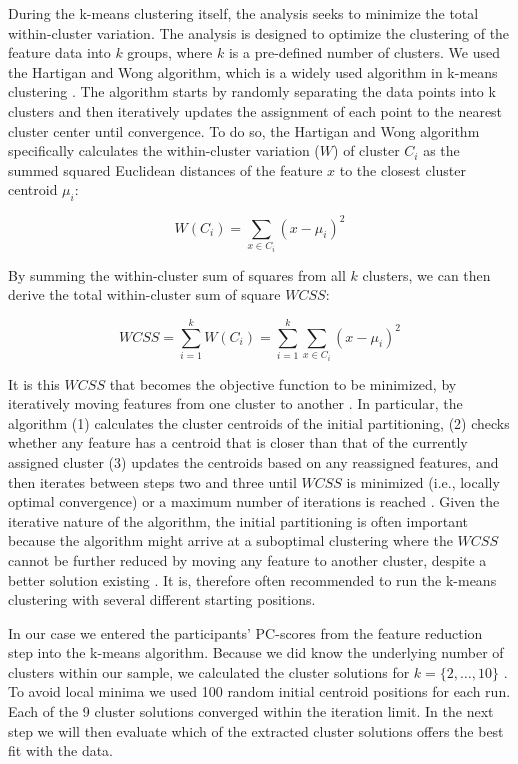 During the k-means clustering itself, the analysis seeks to minimize the
total within-cluster variation. The analysis is designed to optimize the
clustering of the feature data into \(k\) groups, where \(k\) is a
pre-defined number of clusters. We used the Hartigan and Wong algorithm,
which is a widely used algorithm in k-means clustering
\citep{hartigan1979}. The algorithm starts by randomly separating the
data points into k clusters and then iteratively updates the assignment
of each point to the nearest cluster center until convergence. To do so,
the Hartigan and Wong algorithm specifically calculates the
within-cluster variation (\(W\)) of cluster \(C_i\) as the summed
squared Euclidean distances of the feature \(x\) to the closest cluster
centroid \(\mu_i\):

\begin{equation} \label{eq:kWCi}
  W(C_i) = \sum_{x \in C_i}(x-\mu_i)^2
\end{equation}

By summing the within-cluster sum of squares from all \(k\) clusters, we
can then derive the total within-cluster sum of square \(WCSS\):

\begin{equation} \label{eq:kWCSS}
  WCSS = \sum_{i=1}^k W(C_i) = \sum_{i=1}^k \sum_{x \in C_i} (x - \mu_i)^2
\end{equation}

It is this \(WCSS\) that becomes the objective function to be minimized,
by iteratively moving features from one cluster to another
\citep{hartigan1979}. In particular, the algorithm (1) calculates the
cluster centroids of the initial partitioning, (2) checks whether any
feature has a centroid that is closer than that of the currently
assigned cluster (3) updates the centroids based on any reassigned
features, and then iterates between steps two and three until \(WCSS\)
is minimized (i.e., locally optimal convergence) or a maximum number of
iterations is reached \citep{jain2010}. Given the iterative nature of
the algorithm, the initial partitioning is often important because the
algorithm might arrive at a suboptimal clustering where the \(WCSS\)
cannot be further reduced by moving any feature to another cluster,
despite a better solution existing
\citep[i.e., a local minimum;][]{timmerman2013}. It is, therefore often
recommended to run the k-means clustering with several different
starting positions.

In our case we entered the participants' PC-scores from the feature
reduction step into the k-means algorithm. Because we did know the
underlying number of clusters within our sample, we calculated the
cluster solutions for \(k=\{2, \dots , 10\}\) . To avoid local minima we
used 100 random initial centroid positions for each run. Each of the 9
cluster solutions converged within the iteration limit. In the next step
we will then evaluate which of the extracted cluster solutions offers
the best fit with the data.

